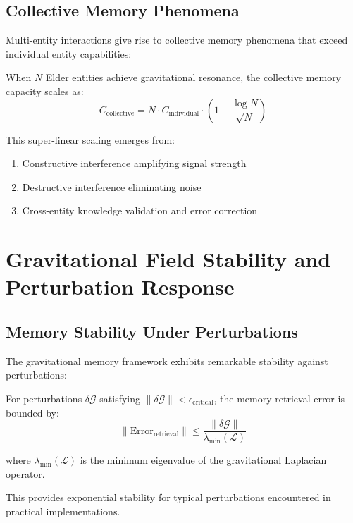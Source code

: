 \subsection{Collective Memory Phenomena}

Multi-entity interactions give rise to collective memory phenomena that exceed individual entity capabilities:

\begin{theorem}
\label{thm:collective_memory}
When $N$ Elder entities achieve gravitational resonance, the collective memory capacity scales as:
\begin{equation}
C_{\text{collective}} = N \cdot C_{\text{individual}} \cdot \left(1 + \frac{\log N}{\sqrt{N}}\right)
\end{equation}

This super-linear scaling emerges from:
\begin{enumerate}
    \item Constructive interference amplifying signal strength
    \item Destructive interference eliminating noise
    \item Cross-entity knowledge validation and error correction
\end{enumerate}
\end{theorem}

\section{Gravitational Field Stability and Perturbation Response}

\subsection{Memory Stability Under Perturbations}

The gravitational memory framework exhibits remarkable stability against perturbations:

\begin{theorem}
\label{thm:memory_stability}
For perturbations $\delta \mathcal{G}$ satisfying $\|\delta \mathcal{G}\| < \epsilon_{\text{critical}}$, the memory retrieval error is bounded by:
\begin{equation}
\|\text{Error}_{\text{retrieval}}\| \leq \frac{\|\delta \mathcal{G}\|}{\lambda_{\text{min}}(\mathcal{L})}
\end{equation}

where $\lambda_{\text{min}}(\mathcal{L})$ is the minimum eigenvalue of the gravitational Laplacian operator.

This provides exponential stability for typical perturbations encountered in practical implementations.
\end{theorem}

